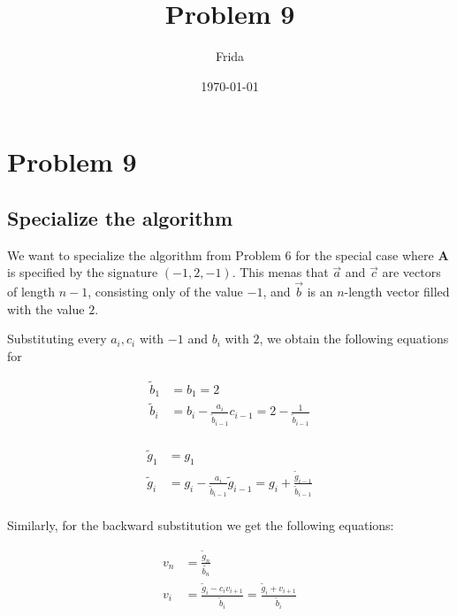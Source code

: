 \documentclass[english,notitlepage]{revtex4-1}  %
\begin{document}
\title{Problem 9}      %
\author{Frida}          %
\date{\today}                             %
\noaffiliation                            %

\maketitle

\section{Problem 9}

\subsection{Specialize the algorithm}


We want to specialize the algorithm from Problem 6 for the special case where $\boldsymbol{A}$ is specified by the signature $(-1, 2, -1)$. This menas that $\vec{a}$ and $\vec{c}$ are vectors of length $n-1$, consisting only of the value $-1$, and $\vec{b}$ is an $n$-length vector filled with the value $2$.

Substituting every $a_i, c_i$ with $-1$ and $b_i$ with $2$, we obtain the following equations for

\begin{equation}
  \begin{split}
    \tilde{b}_1 &= b_1 = 2 \\
    \tilde{b}_i &= b_i - \frac{a_i}{\tilde{b}_{i-1}} c_{i-1} = 2 - \frac{1}{\tilde{b}_{i-1}} \\ \label{eqn:specalg_b}
   \end{split}
\end{equation}

\begin{equation}
  \begin{split}
    \tilde{g}_1 &= g_1 \\
    \tilde{g}_i &= g_i - \frac{a_i}{\tilde{b}_{i-1}} \tilde{g}_{i-1} = g_i + \frac{\tilde{g}_{i-1}}{\tilde{b}_{i-1}} \\ \label{eqn:specalg_g}
   \end{split}
\end{equation}

Similarly, for the backward substitution we get the following equations:

\begin{equation}
  \begin{split}
    v_n &= \frac{\tilde{g}_n}{\tilde{b_n}} \\
    v_i &= \frac{\tilde{g}_i - c_i v_{i+1}}{\tilde{b}_i} = \frac{\tilde{g}_i + v_{i+1}}{\tilde{b}_i} \\ \label{eqn:specalg_v}
   \end{split}
\end{equation}
\end{document}
